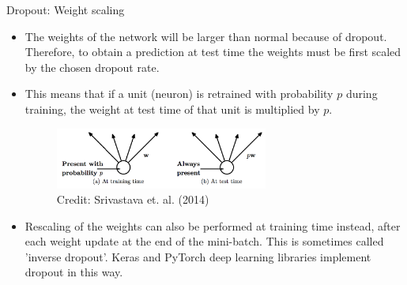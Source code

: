 \begin{vbframe}{Dropout: Weight scaling}
\begin{itemize}
\item The weights of the network will be larger than normal because of dropout. Therefore, to obtain a prediction at test time the weights must be first scaled by the chosen dropout rate.
\item This means that if a unit (neuron) is retrained with probability $p$ during training, the weight at test time of that unit is multiplied by $p$.
\begin{figure}
\centering
\includegraphics[width=7cm]{plots/dropout_neuron.png}
\tiny{\\ Credit: Srivastava et. al. (2014)}
\end{figure}
\item Rescaling of the weights can also be performed at training time instead, after each weight update at the end of the mini-batch. This is sometimes called 'inverse dropout'. Keras and PyTorch deep learning libraries implement dropout in this way.
\end{itemize}
\end{vbframe}

